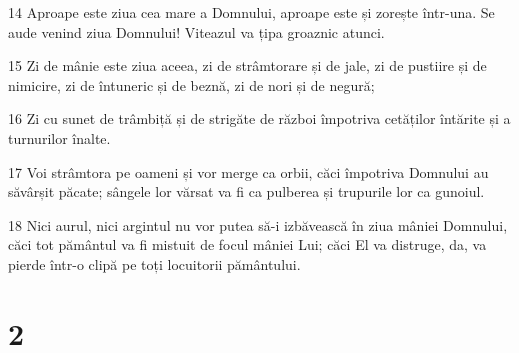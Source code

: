 \par 14 Aproape este ziua cea mare a Domnului, aproape este și zorește într-una. Se aude venind ziua Domnului! Viteazul va țipa groaznic atunci.
\par 15 Zi de mânie este ziua aceea, zi de strâmtorare și de jale, zi de pustiire și de nimicire, zi de întuneric și de beznă, zi de nori și de negură;
\par 16 Zi cu sunet de trâmbiță și de strigăte de război împotriva cetăților întărite și a turnurilor înalte.
\par 17 Voi strâmtora pe oameni și vor merge ca orbii, căci împotriva Domnului au săvârșit păcate; sângele lor vărsat va fi ca pulberea și trupurile lor ca gunoiul.
\par 18 Nici aurul, nici argintul nu vor putea să-i izbăvească în ziua mâniei Domnului, căci tot pământul va fi mistuit de focul mâniei Lui; căci El va distruge, da, va pierde într-o clipă pe toți locuitorii pământului.

\chapter{2}

